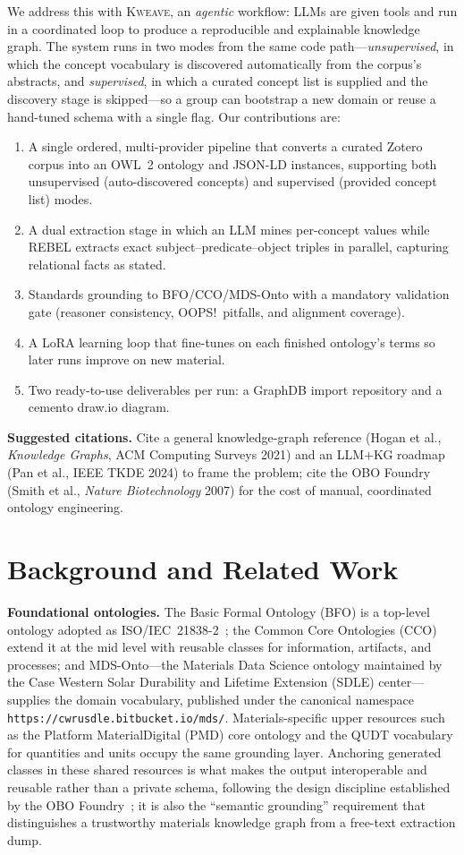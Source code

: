 \documentclass[Afour,sageh,times]{sagej}
\newcommand{\readingnote}[1]{%
  \par\smallskip\noindent\colorbox{gray!12}{%
  \parbox{\dimexpr\linewidth-2\fboxsep}{\footnotesize\textbf{Suggested citations.} #1}}\par}
\begin{document}
We address this with \textsc{Kweave}, an \emph{agentic} workflow: LLMs are given tools and run in
a coordinated loop to produce a reproducible and explainable knowledge graph. The system runs in two
modes from the same code path---\emph{unsupervised}, in which the concept vocabulary is discovered
automatically from the corpus's abstracts, and \emph{supervised}, in which a curated concept list is
supplied and the discovery stage is skipped---so a group can bootstrap a new domain or reuse a
hand-tuned schema with a single flag. Our contributions are:
\begin{enumerate}[itemsep=2pt,topsep=2pt]
  \item A single ordered, multi-provider pipeline that converts a curated Zotero corpus into an
        OWL~2 ontology and JSON-LD instances, supporting both unsupervised (auto-discovered
        concepts) and supervised (provided concept list) modes.
  \item A dual extraction stage in which an LLM mines per-concept values while REBEL extracts
        exact subject--predicate--object triples in parallel, capturing relational facts as stated.
  \item Standards grounding to BFO/CCO/MDS-Onto with a mandatory validation gate
        (reasoner consistency, OOPS!\ pitfalls, and alignment coverage).
  \item A LoRA learning loop that fine-tunes on each finished ontology's terms so later runs
        improve on new material.
  \item Two ready-to-use deliverables per run: a GraphDB import repository and a cemento draw.io
        diagram.
\end{enumerate}
\readingnote{Cite a general knowledge-graph reference (Hogan et al., \emph{Knowledge Graphs},
ACM Computing Surveys 2021) and an LLM$+$KG roadmap (Pan et al., IEEE TKDE 2024) to frame the
problem; cite the OBO Foundry (Smith et al., \emph{Nature Biotechnology} 2007) for the cost of
manual, coordinated ontology engineering.}

\section{Background and Related Work}
\textbf{Foundational ontologies.} The Basic Formal Ontology (BFO) is a top-level ontology adopted
as ISO/IEC~21838-2~\cite{bfo}; the Common Core Ontologies (CCO) extend it at the mid level with
reusable classes for information, artifacts, and processes; and MDS-Onto---the Materials Data Science
ontology maintained by the Case Western Solar Durability and Lifetime Extension (SDLE) center---supplies
the domain vocabulary, published under the canonical namespace
\texttt{https://cwrusdle.bitbucket.io/mds/}. Materials-specific upper resources such as the
Platform MaterialDigital (PMD) core ontology and the QUDT vocabulary for quantities and units occupy
the same grounding layer. Anchoring generated classes in these shared resources is what makes the
output interoperable and reusable rather than a private schema, following the design discipline
established by the OBO Foundry~\cite{smith2007obo}; it is also the ``semantic grounding'' requirement
that distinguishes a trustworthy materials knowledge graph from a free-text extraction dump.
\end{document}

